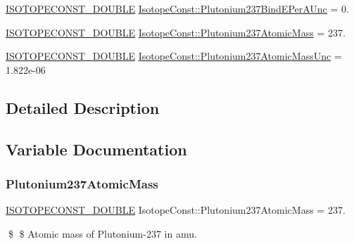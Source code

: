\begin{DoxyCompactItemize}
\mbox{\hyperlink{group___isotope_const-_macros_ga8f45a7272ce02c0b4c65c44636ed719a}{I\+S\+O\+T\+O\+P\+E\+C\+O\+N\+S\+T\+\_\+\+D\+O\+U\+B\+LE}} \mbox{\hyperlink{group___isotope_const-_plutonium-_pu237_gaac000eb4d4274a6afa84af7b4e4a97f7}{Isotope\+Const\+::\+Plutonium237\+Bind\+E\+Per\+A\+Unc}} = 0.
\item 
\mbox{\hyperlink{group___isotope_const-_macros_ga8f45a7272ce02c0b4c65c44636ed719a}{I\+S\+O\+T\+O\+P\+E\+C\+O\+N\+S\+T\+\_\+\+D\+O\+U\+B\+LE}} \mbox{\hyperlink{group___isotope_const-_plutonium-_pu237_ga0e25e10843f4e43a56dc16496ccf3358}{Isotope\+Const\+::\+Plutonium237\+Atomic\+Mass}} = 237.
\item 
\mbox{\hyperlink{group___isotope_const-_macros_ga8f45a7272ce02c0b4c65c44636ed719a}{I\+S\+O\+T\+O\+P\+E\+C\+O\+N\+S\+T\+\_\+\+D\+O\+U\+B\+LE}} \mbox{\hyperlink{group___isotope_const-_plutonium-_pu237_ga3260a1d557870cd80feae7b8059ee22f}{Isotope\+Const\+::\+Plutonium237\+Atomic\+Mass\+Unc}} = 1.\+822e-\/06
\end{DoxyCompactItemize}


\subsection{Detailed Description}


\subsection{Variable Documentation}
\mbox{\label{group___isotope_const-_plutonium-_pu237_ga0e25e10843f4e43a56dc16496ccf3358}} 
\subsubsection{\texorpdfstring{Plutonium237\+Atomic\+Mass}{Plutonium237AtomicMass}}
{\footnotesize\ttfamily \mbox{\hyperlink{group___isotope_const-_macros_ga8f45a7272ce02c0b4c65c44636ed719a}{I\+S\+O\+T\+O\+P\+E\+C\+O\+N\+S\+T\+\_\+\+D\+O\+U\+B\+LE}} Isotope\+Const\+::\+Plutonium237\+Atomic\+Mass = 237.}

\$ \$ Atomic mass of Plutonium-\/237 in amu. \mbox{\label{group___isotope_const-_plutonium-_pu237_ga3260a1d557870cd80feae7b8059ee22f}} 
